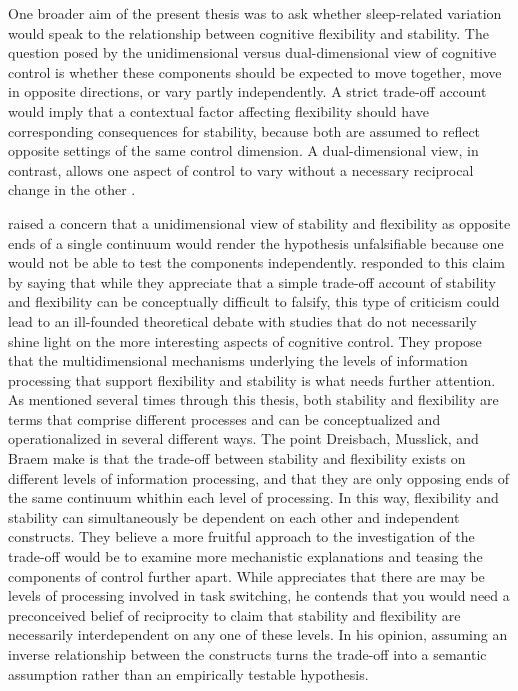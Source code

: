 \documentclass[12pt,a4paper]{report}
\begin{document}
One broader aim of the present thesis was to ask whether sleep-related variation would speak to the relationship between cognitive flexibility and stability. The question posed by the unidimensional versus dual-dimensional view of cognitive control is whether these components should be expected to move together, move in opposite directions, or vary partly independently. A strict trade-off account would imply that a contextual factor affecting flexibility should have corresponding consequences for stability, because both are assumed to reflect opposite settings of the same control dimension. A dual-dimensional view, in contrast, allows one aspect of control to vary without a necessary reciprocal change in the other \parencite{egner2023principles,nack2023metacognition}.

\textcite{egner2023principles} raised a concern that a unidimensional view of stability and flexibility as opposite ends of a single continuum would render the hypothesis unfalsifiable because one would not be able to test the components independently. \textcite{dreisbach2024dependent} responded to this claim by saying that while they appreciate that a simple trade-off account of stability and flexibility can be conceptually difficult to falsify, this type of criticism could lead to an ill-founded theoretical debate with studies that do not necessarily shine light on the more interesting aspects of cognitive control. They propose that the multidimensional mechanisms underlying the levels of information processing that support flexibility and stability is what needs further attention.  As mentioned several times through this thesis, both stability and flexibility are terms that comprise different processes and can be conceptualized and operationalized in several different ways. The point Dreisbach, Musslick, and Braem make is that the trade-off between stability and flexibility exists on different levels of information processing, and that they are only opposing ends of the same continuum whithin each level of processing. In this way, flexibility and stability can simultaneously be dependent on each other and independent constructs. They believe a more fruitful approach to the investigation of the trade-off would be to examine more mechanistic explanations and teasing the components of control further apart. While \textcite{egner2024reply} appreciates that there are may be levels of processing involved in task switching, he contends that you would need a preconceived belief of reciprocity to claim that stability and flexibility are necessarily interdependent on any one of these levels. In his opinion, assuming an inverse relationship between the constructs turns the trade-off into a semantic assumption rather than an empirically testable hypothesis. 
\end{document}
